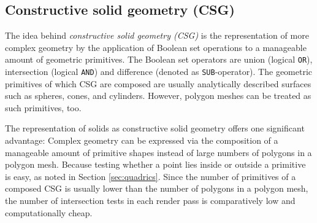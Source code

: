 \subsection{Constructive solid geometry (CSG)}

The idea behind \emph{constructive solid geometry (CSG)} is the representation of more complex geometry by the application of Boolean set operations to a manageable amount of geometric primitives. The Boolean set operators are union (logical \texttt{OR}), intersection (logical \texttt{AND}) and difference (denoted as \texttt{SUB}-operator).
The geometric primitives of which CSG are composed are usually analytically described surfaces such as spheres, cones, and cylinders. However, polygon meshes can be treated as such primitives, too.   

The representation of solids as constructive solid geometry offers one significant advantage: Complex geometry can be expressed via the composition of a manageable amount of primitive shapes instead of large numbers of polygons in a polygon mesh. Because testing whether a point lies inside or outside a primitive is easy, as noted in Section \ref{sec:quadrics}. Since the number of primitives of a composed CSG is usually lower than the number of polygons in a polygon mesh, the number of intersection tests in each render pass is comparatively low and computationally cheap.

